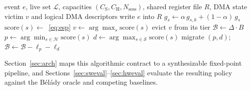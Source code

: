 \begin{algorithm}[t]
\caption{\unison event loop}
\label{alg:unison}
\begin{algorithmic}[1]
\REQUIRE event $e$, live set $\mathcal{L}$, capacities
         $(C_{\mathrm{S}},C_{\mathrm{H}},N_{\mathrm{sess}})$,
         shared register file $R$, DMA state
\ENSURE  victim $v$ and logical DMA descriptors
\STATE write $e$ into $R$
  \STATE $g_s\leftarrow\alpha\,g_{s,k}+(1-\alpha)\,g_s$
         \COMMENT{\eqref{eq:ema}}
\ENDIF
{}
    \STATE $\mathrm{score}(s)\leftarrow$~\eqref{eq:esp}
  \ENDFOR
  \STATE $v\leftarrow\arg\max_{s}\mathrm{score}(s)$
  \STATE evict $v$ from its tier
\ENDIF
{}
  \STATE $\mathcal{B}\leftarrow\Delta\cdot B$
    \STATE $p\leftarrow\arg\min_{s\in\mathcal{H}}\mathrm{score}(s)$
    \STATE $d\leftarrow\arg\max_{s\in\mathcal{S}}\mathrm{score}(s)$
    \STATE migrate $(p,d)$;
           $\mathcal{B}\leftarrow\mathcal{B}-\ell_p-\ell_d$
  \ENDWHILE
\ENDIF
\end{algorithmic}
\end{algorithm}

Section~\ref{sec:arch} maps this algorithmic contract to a
synthesizable fixed-point pipeline, and
Sections~\ref{sec:sweval}--\ref{sec:hweval} evaluate the resulting
policy against the B\'el\'ady oracle and competing baselines.

